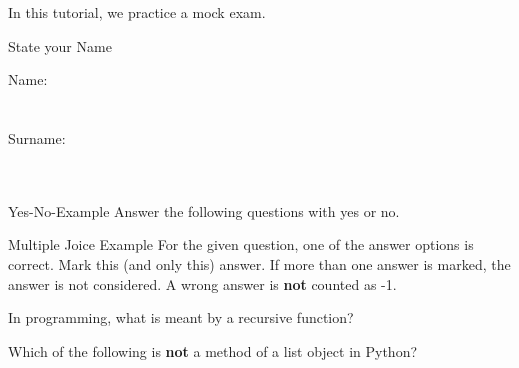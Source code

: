 \documentclass[twoside]{article}
\begin{document}
\maketitle

\vspace{10pt}

In this tutorial, we practice a mock exam.

\vspace{10pt}

\begin{task}{State your Name}{}{}

Name: \\
 \\
 \\
Surname: \\
 \\
 \\

\end{task}

\begin{task}{Yes-No-Example}{}{}
Answer the following questions with yes or no. \\

\begin{yesnolist}
\end{yesnolist}
\end{task}

\clearpage

\begin{task}{Multiple Joice Example}{}{}
For the given question, one of the answer options is correct. Mark this (and only this) answer. If more than one answer is marked, the answer is not considered. A wrong answer is \textbf{not} counted as -1.\vspace{1cm}

  \begin{multiplechoice}{In programming, what is meant by a recursive function?}
  \end{multiplechoice}

  \begin{multiplechoice}{Which of the following is \textbf{not} a method of a list object in Python?}
  \end{multiplechoice}
\end{task}
\end{document}
